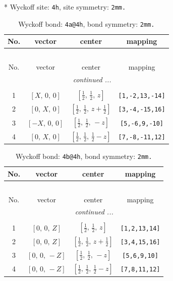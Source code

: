 \documentclass[fleqn,8pt]{jsarticle}
\begin{document}
* Wyckoff site: {\tt 4h}, site symmetry: {\tt 2mm.}
\renewcommand{\arraystretch}{1.2}
\begin{longtable}{cccc}
\caption{Wyckoff bond: {\tt 4a@4h}, bond symmetry: {\tt 2mm.}}
 \\
 \hline \hline
No. & vector & center & mapping \\ \hline \endfirsthead

\multicolumn{3}{l}{\tablename\ \thetable{}} \\
 \hline \hline
No. & vector & center & mapping \\ \hline \endhead

 \hline \hline
\multicolumn{3}{r}{\footnotesize\it continued ...} \\ \endfoot

 \hline \hline
\multicolumn{3}{r}{} \\ \endlastfoot

1 & $\left[ X,\, 0,\, 0 \right]$ & $\left[ \frac{1}{2},\, \frac{1}{2},\, z \right]$ & {\tt [1,-2,13,-14]} \\ \hline
2 & $\left[ 0,\, X,\, 0 \right]$ & $\left[ \frac{1}{2},\, \frac{1}{2},\, z + \frac{1}{2} \right]$ & {\tt [3,-4,-15,16]} \\ \hline
3 & $\left[ - X,\, 0,\, 0 \right]$ & $\left[ \frac{1}{2},\, \frac{1}{2},\, - z \right]$ & {\tt [5,-6,9,-10]} \\ \hline
4 & $\left[ 0,\, X,\, 0 \right]$ & $\left[ \frac{1}{2},\, \frac{1}{2},\, \frac{1}{2} - z \right]$ & {\tt [7,-8,-11,12]} \\
\end{longtable}
\renewcommand{\arraystretch}{1.2}
\begin{longtable}{cccc}
\caption{Wyckoff bond: {\tt 4b@4h}, bond symmetry: {\tt 2mm.}}
 \\
 \hline \hline
No. & vector & center & mapping \\ \hline \endfirsthead

\multicolumn{3}{l}{\tablename\ \thetable{}} \\
 \hline \hline
No. & vector & center & mapping \\ \hline \endhead

 \hline \hline
\multicolumn{3}{r}{\footnotesize\it continued ...} \\ \endfoot

 \hline \hline
\multicolumn{3}{r}{} \\ \endlastfoot

1 & $\left[ 0,\, 0,\, Z \right]$ & $\left[ \frac{1}{2},\, \frac{1}{2},\, z \right]$ & {\tt [1,2,13,14]} \\ \hline
2 & $\left[ 0,\, 0,\, Z \right]$ & $\left[ \frac{1}{2},\, \frac{1}{2},\, z + \frac{1}{2} \right]$ & {\tt [3,4,15,16]} \\ \hline
3 & $\left[ 0,\, 0,\, - Z \right]$ & $\left[ \frac{1}{2},\, \frac{1}{2},\, - z \right]$ & {\tt [5,6,9,10]} \\ \hline
4 & $\left[ 0,\, 0,\, - Z \right]$ & $\left[ \frac{1}{2},\, \frac{1}{2},\, \frac{1}{2} - z \right]$ & {\tt [7,8,11,12]} \\
\end{longtable}
\end{document}
